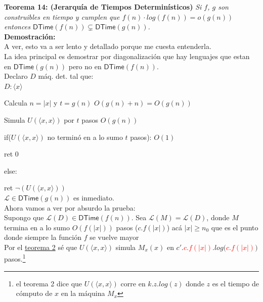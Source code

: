 \documentclass{article}
\begin{document}
\begin{flushleft}
  \textbf{Teorema 14: \hypertarget{jerTdet}{\textcolor{Bittersweet}{(Jerarquía de Tiempos Determinísticos)}}}
  \textit{Si $f$, $g$ son construibles en tiempo y cumplen que $f(n) \cdot log(f(n)) = o(g(n))$ entonces $
  \mathsf{DTime}(f(n)) \subsetneq \mathsf{DTime}(g(n))$.} \\[0.5em]

  \textbf{\textcolor{Mulberry}{Demostración:}} \\[0.5em]

  A ver, esto va a ser lento y detallado porque me cuesta entenderla. \\[0.5em]

  La idea principal es demostrar por diagonalización que hay lenguajes que estan en $\mathsf{DTime}(g(n))$
  pero no en $\mathsf{DTime}(f(n))$. \\[0.5em]

  Declaro $D$ máq. det. tal que: \\[0.5em]

  $D: \langle x \rangle$

  \quad Calcula $n = |x|$ y $t = g(n)$ \qquad \textcolor{OliveGreen}{$O(g(n) + n) = O(g(n))$}

  \quad Simula $U(\langle x,x \rangle)$ por $t$ pasos \qquad \textcolor{OliveGreen}{$O(g(n))$}

  \quad if($U(\langle x,x \rangle)$ no terminó en a lo sumo $t$ pasos): \qquad \textcolor{OliveGreen}{$O(1)$}

  \qquad ret $0$

  \quad else:
  
  \qquad ret $\lnot (U(\langle x,x \rangle))$ \\[0.5em]

  $\mathcal{L} \in \mathsf{DTime}(g(n))$ es inmediato. \\[0.5em]

  Ahora vamos a ver por absurdo la prueba: \\[0.5em]

  \quad Supongo que $\mathcal{L}(D) \in \mathsf{DTime}(f(n))$. Sea $\mathcal{L}(M) = \mathcal{L}(D)$, 
  donde $M$ termina en a lo sumo $O(f(|x|))$ pasos ($c.f(|x|)$) \textcolor{OliveGreen}{acá $|x| \geq n_0$ 
  que es el punto donde siempre la función $f$ se vuelve mayor} \\[0.5em]

  Por el \hyperlink{teo2}{\textcolor{Rhodamine}{teorema 2}} sé que $U(\langle x,x \rangle)$ simula $M_x(x)$
  en $c'.$\textcolor{Red}{$c.f(|x|)$}$.log($\textcolor{Red}{$c.f(|x|)$}$)$ pasos.\footnote{
  el teorema 2 dice que $U(\langle x,x \rangle)$ corre en $k.z.log(z)$ donde $z$ es el tiempo de cómputo 
  de $x$ en la máquina $M_x$} \\[0.5em]


\end{flushleft}
\end{document}
